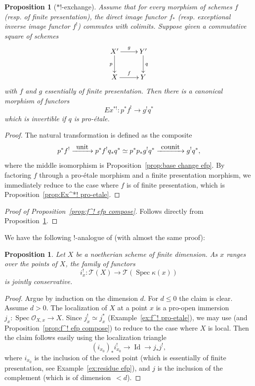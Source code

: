 \documentclass[11pt]{article}
\newcommand{\resp}{resp.\xspace}
\numberwithin{equation}{section}\renewcommand{\encodingdefault}{TU}
\def\To#1{\mathchoice{\xrightarrow{\textstyle\kern4pt#1\kern3pt}}{\stackrel{#1}{\longrightarrow}}{}{}}
\newcommand{\T}{\mathscr T}
\DeclareMathOperator{\Id}{Id}
\DeclareMathOperator{\spec}{Spec}
\newcommand{\OO}{\mathcal O}
\newtheorem{prop}[thm]{Proposition}
\theoremstyle{remark}
\theoremstyle{definition}
\numberwithin{equation}{thm}
\begin{document}
\begin{prop}[$*!$-exchange]\label{prop:Ex^*! efp}
Assume that for every morphism of schemes $f$ (\resp of finite presentation), the direct image functor $f_*$ (\resp exceptional inverse image functor $f^!$) commutes with colimits.
Suppose given a commutative square of schemes
\[
\xymatrix{
X' \ar[r]^-{g}\ar[d]_{p}
& Y' \ar[d]^{q}
\\
X \ar[r]^-{f}
& Y
}
\]
with $f$ and $g$ essentially of finite presentation.
Then there is a canonical morphism of functors
\[
Ex^{*!} : p^*f^! \to g^!q^*
\]
which is invertible if $q$ is pro-étale.
\end{prop}
\begin{proof}
The natural transformation is defined as the composite
\[
p^*f^!
\To{\mathrm{unit}} p^*f^!q_*q^*
\simeq p^*p_*g^!q^*
\To{\mathrm{counit}}
g^!q^*,
\]
where the middle isomorphism is Proposition~\ref{prop:base change efp}.
By factoring $f$ through a pro-étale morphism and a finite presentation morphism, we immediately reduce to the case where $f$ is of finite presentation, which is Proposition~\ref{prop:Ex^*! pro-etale}.
\end{proof}

\begin{proof}[Proof of Proposition~\ref{prop:f^! efp compose}]
Follows directly from Proposition~\ref{prop:Ex^*! efp}.
\end{proof}

We have the following $!$-analogue of \cite[Cor.\,4.3.17]{CD3} (with almost the same proof):

\begin{prop}\label{prop:shriek conservative}
Let $X$ be a noetherian scheme of finite dimension.
As $x$ ranges over the points of $X$, the family of functors
\[
i_x^! : \T(X) \to \T(\spec{\kappa(x)})
\]
is jointly conservative.
\end{prop}
\begin{proof}
Argue by induction on the dimension $d$.
For $d\leqslant 0$ the claim is clear.
Assume $d>0$.
The localization of $X$ at a point $x$ is a pro-open immersion \hbox{$j_x : \spec{\OO_{X,x}} \to X$}.
Since $j_x^! \simeq j_x^*$ (Example~\ref{ex:f^! pro-etale}), we may use \cite[Prop.\,4.3.9]{CD3} (and Proposition~\ref{prop:f^! efp compose}) to reduce to the case where $X$ is local.
Then the claim follows easily using the localization triangle
\[
(i_{x_0})_*i_{x_0}^! \to \Id \to j_*j^!,
\]
where $i_{x_0}$ is the inclusion of the closed point (which is essentially of finite presentation, see Example~\ref{ex:residue efp}), and $j$ is the inclusion of the complement (which is of dimension~\hbox{$< d$}).
\end{proof}
\end{document}
